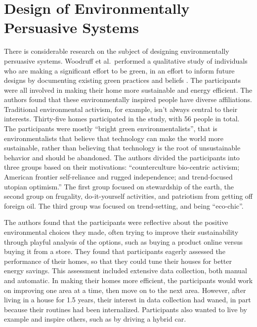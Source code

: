 \section{Design of Environmentally Persuasive Systems}

There is considerable research on the subject of designing environmentally persuasive systems. Woodruff et al.\ performed a qualitative study of individuals who are making a significant effort to be green, in an effort to inform future designs by documenting existing green practices and beliefs \cite{Woodruff2008-bright-green}. The participants were all involved in making their home more sustainable and energy efficient. The authors found that these environmentally inspired people have diverse affiliations. Traditional environmental activism, for example, isn't always central to their interests. Thirty-five homes participated in the study, with 56 people in total. The participants were mostly ``bright green environmentalists'', that is environmentalists that believe that technology can make the world more sustainable, rather than believing that technology is the root of unsustainable behavior and should be abandoned. The authors divided the participants into three groups based on their motivations: ``counterculture bio-centric activism; American frontier self-reliance and rugged independence; and trend-focused utopian optimism.'' The first group focused on stewardship of the earth, the second group on frugality, do-it-yourself activities, and patriotism from getting off foreign oil. The third group was focused on trend-setting, and being ``eco-chic''.

The authors found that the participants were reflective about the positive environmental choices they made, often trying to improve their sustainability through playful analysis of the options, such as buying a product online versus buying it from a store. They found that participants eagerly assessed the performance of their homes, so that they could tune their houses for better energy savings. This assessment included extensive data collection, both manual and automatic. In making their homes more efficient, the participants would work on improving one area at a time, then move on to the next area. However, after living in a house for 1.5 years, their interest in data collection had waned, in part because their routines had been internalized. Participants also wanted to live by example and inspire others, such as by driving a hybrid car.

